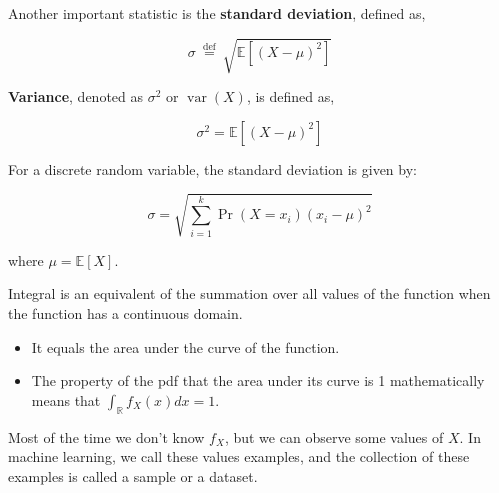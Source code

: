 \documentclass[9pt,dvipsnames]{beamer}
\begin{document}
\begin{frame}
	Another important statistic is the \textbf{standard deviation}, defined as,

	$$
		\sigma \stackrel{\text { def }}{=} \sqrt{\mathbb{E}\left[(X-\mu)^{2}\right]}
	$$

	\textbf{Variance}, denoted as $\sigma^{2}$ or $\operatorname{var}(X)$, is defined as,

	$$
		\sigma^{2}=\mathbb{E}\left[(X-\mu)^{2}\right]
	$$

	For a discrete random variable, the standard deviation is given by:

	\[
		\sigma = \sqrt{\sum_{i=1}^{k} \operatorname{Pr}(X=x_i) (x_i - \mu)^2}
	\]


	where $\mu=\mathbb{E}[X]$.
\end{frame}

\begin{frame}
	Integral is an equivalent of the summation over all values of the function when the function has a continuous domain.
	\begin{itemize}
		\item  It equals the area under the curve of the function.
		\item  The property of the pdf that the area under its curve is 1 mathematically means that $\int_{\mathbb{R}} f_{X}(x) d x=1$.
	\end{itemize}
	Most of the time we don't know $f_{X}$, but we can observe some values of $X$. In machine learning, we call these values examples, and the collection of these examples is called a sample or a dataset.
\end{frame}
\end{document}
